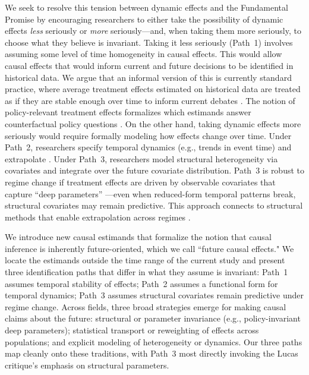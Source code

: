 \documentclass{article}
\begin{document}
We seek to resolve this tension between dynamic effects and the Fundamental Promise by encouraging researchers to either take the possibility of dynamic effects \textit{less} seriously or \textit{more} seriously---and, when taking them more seriously, to choose what they believe is invariant. Taking it less seriously (Path~1) involves assuming some level of time homogeneity in causal effects. This would allow causal effects that would inform current and future decisions to be identified in historical data. We argue that an informal version of this is currently standard practice, where average treatment effects estimated on historical data are treated as if they are stable enough over time to inform current debates \citep{gablerDealingHeterogeneityTreatment2009,cintronHeterogeneousTreatmentEffects2022}. The notion of policy-relevant treatment effects formalizes which estimands answer counterfactual policy questions \citep{heckmanPolicyRelevantTreatmentEffects2001,sasakiEstimationInferencePolicy2023}. On the other hand, taking dynamic effects more seriously would require formally modeling how effects change over time. Under Path~2, researchers specify temporal dynamics (e.g., trends in event time) and extrapolate \citep{khosrowiExtrapolationCausalEffects2019,maebaExtrapolationTreatmentEffect2024}. Under Path~3, researchers model structural heterogeneity via covariates and integrate over the future covariate distribution. Path~3 is robust to regime change if treatment effects are driven by observable covariates that capture ``deep parameters'' \citep{lucasjrEconometricPolicyEvaluation1976}---even when reduced-form temporal patterns break, structural covariates may remain predictive. This approach connects to structural methods that enable extrapolation across regimes \citep{heckmanStructuralEquationsTreatment2005,pearlExternalValidityCalculus2022}. 

We introduce new causal estimands that formalize the notion that causal inference is inherently future-oriented, which we call ``future causal effects." We locate the estimands outside the time range of the current study and present three identification paths that differ in what they assume is invariant: Path~1 assumes temporal stability of effects; Path~2 assumes a functional form for temporal dynamics; Path~3 assumes structural covariates remain predictive under regime change. Across fields, three broad strategies emerge for making causal claims about the future: structural or parameter invariance (e.g., policy-invariant deep parameters); statistical transport or reweighting of effects across populations; and explicit modeling of heterogeneity or dynamics. Our three paths map cleanly onto these traditions, with Path~3 most directly invoking the Lucas critique's emphasis on structural parameters.
\end{document}

